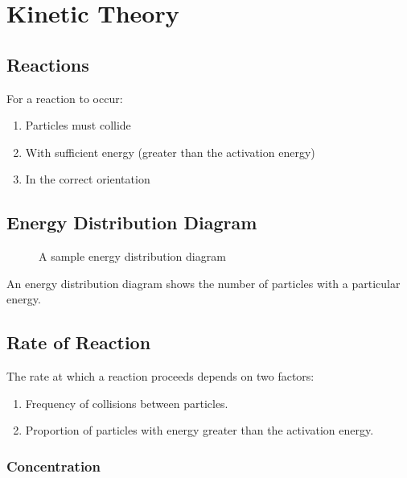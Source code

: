 \documentclass[a4paper,11pt]{article}
\begin{document}
\section{Kinetic Theory}

\subsection{Reactions}

For a reaction to occur:

\begin{enumerate}
\item Particles must collide
\item With sufficient energy (greater than the activation energy)
\item In the correct orientation
\end{enumerate}


\subsection{Energy Distribution Diagram}

\begin{figure}
\begin{center}
\caption{A sample energy distribution diagram}
\label{fig:distribution}
\end{center}
\end{figure}

An energy distribution diagram shows the number of particles with a particular
energy.


\subsection{Rate of Reaction}

The rate at which a reaction proceeds depends on two factors:

\begin{enumerate}
\item Frequency of collisions between particles.
\item Proportion of particles with energy greater than the activation energy.
\end{enumerate}


\subsubsection{Concentration}
\end{document}
